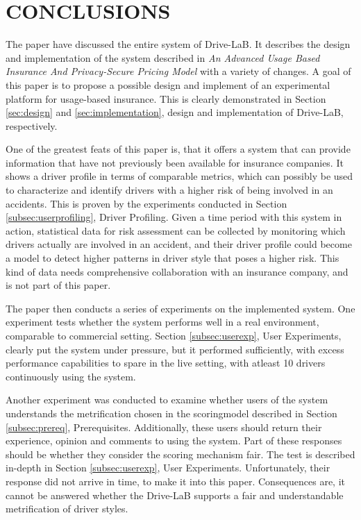 \section{CONCLUSIONS}\label{sec:conclusion}
The paper have discussed the entire system of Drive-LaB. It describes the design and implementation of the system described in \textit{An Advanced Usage Based Insurance And Privacy-Secure Pricing Model}\citep{sw9_report} with a variety of changes. A goal of this paper is to propose a possible design and implement of an experimental platform for usage-based insurance. This is clearly demonstrated in Section \ref{sec:design} and \ref{sec:implementation}, design and implementation of Drive-LaB, respectively.

One of the greatest feats of this paper is, that it offers a system that can provide information that have not previously been available for insurance companies. It shows a driver profile in terms of comparable metrics, which can possibly be used to characterize and identify drivers with a higher risk of being involved in an accidents. This is proven by the experiments conducted in Section \ref{subsec:userprofiling}, Driver Profiling. Given a time period with this system in action, statistical data for risk assessment can be collected by monitoring which drivers actually are involved in an accident, and their driver profile could become a model to detect higher patterns in driver style that poses a higher risk. This kind of data needs comprehensive collaboration with an insurance company, and is not part of this paper.

The paper then conducts a series of experiments on the implemented system. One experiment tests whether the system performs well in a real environment, comparable to commercial setting. Section \ref{subsec:userexp}, User Experiments, clearly put the system under pressure, but it performed sufficiently, with excess performance capabilities to spare in the live setting, with atleast 10 drivers continuously using the system. 

Another experiment was conducted to examine whether users of the system understands the metrification chosen in the scoringmodel described in Section \ref{subsec:prereq}, Prerequisites. Additionally, these users should return their experience, opinion and comments to using the system. Part of these responses should be whether they consider the scoring mechanism fair. The test is described in-depth in Section \ref{subsec:userexp}, User Experiments. Unfortunately, their response did not arrive in time, to make it into this paper. Consequences are, it cannot be answered whether the Drive-LaB supports a fair and understandable metrification of driver styles. 

